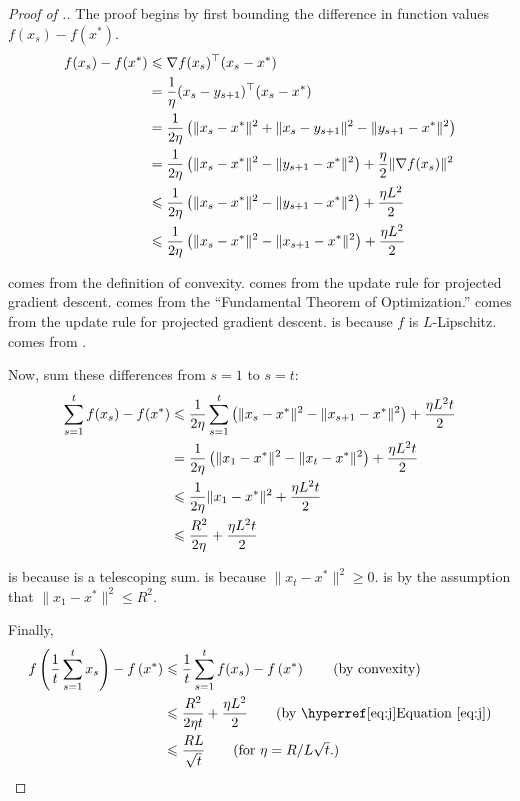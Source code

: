 \begin{proof}[Proof of .]
The proof begins by first bounding the difference in function values $f(x_s) -
f(x^*)$.
%
\begin{align}
    f(x_s) - f(x^*) &\leq \nabla f(x_s)^\trans (x_s - x^*) \equationlabel{a} \\
    &= \frac{1}{\eta}(x_s - y_{s+1})^\trans(x_s - x^*) \equationlabel{b} \\
    &= \frac{1}{2\eta} \left(\lVert x_s - x^* \rVert^2 + \lVert x_s - y_{s+1} \rVert^2 - \lVert y_{s+1} - x^* \rVert^2 \right) \equationlabel{c} \\
    &= \frac{1}{2\eta} \left(\lVert x_s - x^* \rVert^2 - \lVert y_{s+1} - x^* \rVert^2 \right) + \frac{\eta}{2} \lVert \nabla f(x_s) \rVert^2 \equationlabel{d} \\
    &\leq \frac{1}{2\eta} \left(\lVert x_s - x^* \rVert^2 - \lVert y_{s+1} - x^* \rVert^2 \right) + \frac{\eta L^2}{2} \equationlabel{e} \\
    &\leq \frac{1}{2\eta} \left(\lVert x_s - x^* \rVert^2 - \lVert x_{s+1} - x^* \rVert^2 \right) + \frac{\eta L^2}{2} \equationlabel{f}
\end{align}

 comes from the definition of convexity.  comes
from the update rule for projected gradient descent.  comes from
the ``Fundamental Theorem of Optimization.''  comes from the
update rule for projected gradient descent.  is because $f$ is
$L$-Lipschitz. 
comes from .

Now, sum these differences from $s=1$ to $s=t$:
\begin{align}
   \sum_{s=1}^t f(x_s) - f(x^*) &\leq  \frac{1}{2\eta} \sum_{s=1}^t \left(\lVert x_s - x^* \rVert^2 - \lVert x_{s+1} - x^* \rVert^2 \right) + \frac{\eta L^2 t}{2} \equationlabel{g} \\
   &= \frac{1}{2\eta} \left(\lVert x_1 - x^* \rVert^2 - \lVert x_{t} - x^{*} \rVert^2 \right) + \frac{\eta L^2 t}{2} \equationlabel{h} \\
   &\leq \frac{1}{2\eta} \lVert x_1 - x^* \rVert^2 + \frac{\eta L^2 t}{2} \equationlabel{i} \\
   &\leq \frac{R^2}{2\eta} + \frac{\eta L^2 t}{2} \equationlabel{j}
\end{align}

 is because  is a telescoping sum.
 is because $\lVert x_{t} - x^* \rVert^2 \geq 0$.
 is by the assumption that $\lVert x_1 - x^* \rVert^2 \leq R^2$.

Finally,
\begin{align*}
    f\left(\frac{1}{t}\sum_{s=1}^t x_s\right) - f\left(x^*\right)
&\leq \frac{1}{t} \sum_{s=1}^t f(x_s) - f\left(x^*\right) \tag{by convexity} \\
&\leq \frac{R^2}{2\eta t} + \frac{\eta L^2}{2} \tag{by \equationref{j}}\\
&\leq \frac{RL}{\sqrt{t}} \tag{for $\eta=R/L\sqrt{t}.$}
\end{align*}

\end{proof}

